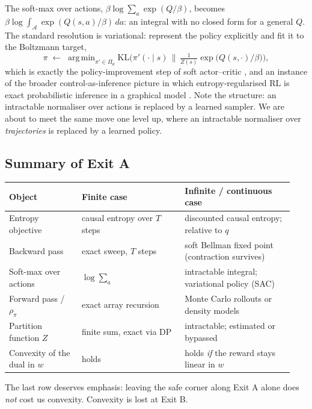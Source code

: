 \documentclass[11pt]{article}
\theoremstyle{plain}
\theoremstyle{definition}
\theoremstyle{remark}
\newcommand{\A}{\mathcal{A}}
\newcommand{\KL}{\mathrm{KL}}
\DeclareMathOperator*{\argmin}{arg\,min}
\begin{document}
The soft-max over actions, $\beta\log\sum_a\exp(Q/\beta)$, becomes
$\beta\log\int_\A \exp(Q(s,a)/\beta)\,da$: an integral with no closed form
for a general $Q$. The standard resolution is variational: represent the
policy explicitly and fit it to the Boltzmann target,
\begin{equation}
\pi \;\leftarrow\; \argmin_{\pi'\in\Pi_\theta} \KL\Big(\pi'(\cdot\mid s)\,\Big\|\,
\tfrac1{Z(s)}\exp\big(Q(s,\cdot)/\beta\big)\Big),
\label{eq:sacstep}
\end{equation}
which is exactly the policy-improvement step of soft actor--critic
\cite{haarnoja2018}, and an instance of the broader control-as-inference
picture in which entropy-regularised RL is exact probabilistic inference
in a graphical model \cite{levine2018tutorial}. Note the structure: an
intractable normaliser over actions is replaced by a learned sampler. We
are about to meet the same move one level up, where an intractable
normaliser over \emph{trajectories} is replaced by a learned policy.

\subsection{Summary of Exit A}

\begin{center}
\begin{tabular}{@{}p{0.24\linewidth}p{0.34\linewidth}p{0.36\linewidth}@{}}
\toprule
\textbf{Object} & \textbf{Finite case} & \textbf{Infinite / continuous case}\\
\midrule
Entropy objective & causal entropy over $T$ steps & discounted causal
entropy; relative to $q$\\
Backward pass & exact sweep, $T$ steps & soft Bellman fixed point
(contraction survives)\\
Soft-max over actions & $\log\sum_a$ & intractable integral; variational
policy (SAC)\\
Forward pass / $\rho_\pi$ & exact array recursion & Monte Carlo rollouts or
density models\\
Partition function $Z$ & finite sum, exact via DP & intractable; estimated
or bypassed\\
Convexity of the dual in $w$ & holds & holds \emph{if} the reward stays
linear in $w$\\
\bottomrule
\end{tabular}
\end{center}

The last row deserves emphasis: leaving the safe corner along Exit A alone
does \emph{not} cost us convexity. Convexity is lost at Exit B.
\end{document}
